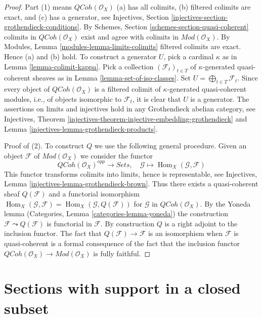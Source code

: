 \documentclass{stacks-project}
\theoremstyle{plain}
\theoremstyle{definition}
\theoremstyle{remark}
\numberwithin{equation}{subsection}
\def\Hom{\mathop{\mathrm{Hom}}\nolimits}
\def\QCoh{\mathit{QCoh}}
\begin{document}
\begin{proof}
Part (1) means $\QCoh(\mathcal{O}_X)$ (a) has all colimits,
(b) filtered colimits are exact, and (c) has a generator, see
Injectives, Section \ref{injectives-section-grothendieck-conditions}.
By Schemes, Section \ref{schemes-section-quasi-coherent}
colimits in $\QCoh(\mathcal{O}_X)$ exist and agree
with colimits in $\textit{Mod}(\mathcal{O}_X)$. By
Modules, Lemma \ref{modules-lemma-limits-colimits}
filtered colimits are exact. Hence (a) and (b) hold.
To construct a generator $U$, pick a cardinal $\kappa$ as in
Lemma \ref{lemma-colimit-kappa}. Pick a collection
$(\mathcal{F}_t)_{t \in T}$ of $\kappa$-generated quasi-coherent sheaves as in
Lemma \ref{lemma-set-of-iso-classes}. Set
$U = \bigoplus_{t \in T} \mathcal{F}_t$. Since every object of
$\QCoh(\mathcal{O}_X)$ is a filtered colimit of $\kappa$-generated
quasi-coherent modules, i.e., of objects isomorphic to $\mathcal{F}_t$,
it is clear that $U$ is a generator.
The assertions on limits and injectives hold in any
Grothendieck abelian category, see
Injectives, Theorem
\ref{injectives-theorem-injective-embedding-grothendieck} and
Lemma \ref{injectives-lemma-grothendieck-products}.

\medskip\noindent
Proof of (2). To construct $Q$ we use the following general procedure.
Given an object $\mathcal{F}$ of $\textit{Mod}(\mathcal{O}_X)$
we consider the functor
$$
\QCoh(\mathcal{O}_X)^{opp} \longrightarrow \textit{Sets},\quad
\mathcal{G} \longmapsto \Hom_X(\mathcal{G}, \mathcal{F})
$$
This functor transforms colimits into limits,
hence is representable, see
Injectives, Lemma \ref{injectives-lemma-grothendieck-brown}.
Thus there exists a quasi-coherent sheaf $Q(\mathcal{F})$
and a functorial isomorphism
$\Hom_X(\mathcal{G}, \mathcal{F}) = \Hom_X(\mathcal{G}, Q(\mathcal{F}))$
for $\mathcal{G}$ in $\QCoh(\mathcal{O}_X)$. By the Yoneda lemma
(Categories, Lemma \ref{categories-lemma-yoneda})
the construction $\mathcal{F} \leadsto Q(\mathcal{F})$ is
functorial in $\mathcal{F}$. By construction $Q$ is a right
adjoint to the inclusion functor.
The fact that $Q(\mathcal{F}) \to \mathcal{F}$ is an isomorphism
when $\mathcal{F}$ is quasi-coherent is a formal consequence of the fact
that the inclusion functor
$\QCoh(\mathcal{O}_X) \to \textit{Mod}(\mathcal{O}_X)$
is fully faithful.
\end{proof}







\section{Sections with support in a closed subset}
\label{section-sections-with-support-in-closed}
\end{document}
